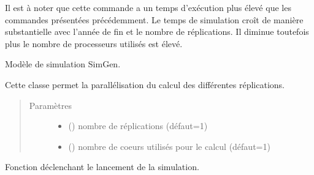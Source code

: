 \documentclass[letterpaper,10pt,french]{sphinxmanual}
\begin{document}
Il est à noter que cette commande a un temps d’exécution plus élevé que les commandes présentées précédemment.
Le temps de simulation croît de manière substantielle avec l’année de fin et le nombre de réplications.
Il diminue toutefois plus le nombre de processeurs utilisés est élevé.


\begin{fulllineitems}
\label{\detokenize{utilisation:id6}}
Modèle de simulation SimGen.

Cette classe permet la parallélisation du calcul des différentes réplications.
\begin{quote}\begin{description}
\item[{Paramètres}] \leavevmode\begin{itemize}
\item {} 
 () \textendash{} nombre de réplications (défaut=1)

\item {} 
 () \textendash{} nombre de coeurs utilisés pour le calcul (défaut=1)

\end{itemize}

\end{description}\end{quote}

\begin{fulllineitems}
\label{\detokenize{utilisation:simgen.replicate.simulate}}
Fonction déclenchant le lancement de la simulation.

\end{fulllineitems}


\end{fulllineitems}
\end{document}
